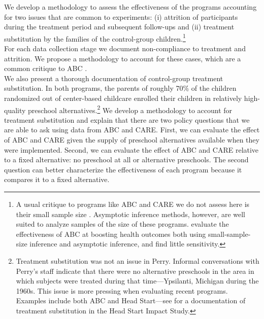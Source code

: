 \noindent We develop a methodology to assess the effectiveness of the programs accounting for two issues that are common to experiments: (i) attrition of participants during the treatment period and subsequent follow-ups and (ii) treatment substitution by the families of the control-group children.\footnote{A usual critique to programs like ABC and CARE we do not assess here is their small sample size \citep{Hanushek_Lindseth_2009_BOOKSchoolhousesCourthouses}. Asymptotic inference methods, however, are well suited to analyze samples of the size of these programs. \citet{Campbell_Conti_etal_2014_EarlyChildhoodInvestments} evaluate the effectiveness of ABC at boosting health outcomes both using small-sample-size inference and asymptotic inference, and find little sensitivity.}\\

\noindent For each data collection stage we document non-compliance to treatment and attrition. We propose a methodology to account for these cases, which are a common critique to ABC \citep{Spitz_1992_ABC-Retardation,Hu_2014_ABC-Study}.\\

\noindent We also present a thorough documentation of control-group treatment substitution. In both programs, the parents of roughly 70\% of the children randomized out of center-based childcare enrolled their children in relatively high-quality preschool alternatives.\footnote{Treatment substitution was not an issue in Perry. Informal conversations with Perry's staff indicate that there were no alternative preschools in the area in which subjects were treated during that time---Ypsilanti, Michigan during the 1960s. This issue is more pressing when evaluating recent programs. Examples include both ABC and Head Start---see \citep{Puma_Bell_etal_2010_HeadStartImpact} for a documentation of treatment substitution in the Head Start Impact Study.} We develop a methodology to account for treatment substitution and explain that there are two policy questions that we are able to ask using data from ABC and CARE. First, we can evaluate the effect of ABC and CARE given the supply of preschool alternatives available when they were implemented. Second, we can evaluate the effect of ABC and CARE relative to a fixed alternative: no preschool at all or alternative preschools. The second question can better characterize the effectiveness of each program because it compares it to a fixed alternative.\\

